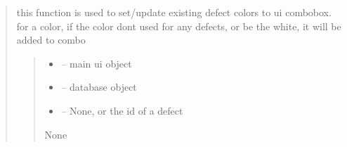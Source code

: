 \documentclass[letterpaper,10pt,english]{sphinxmanual}
\begin{document}
\begin{quote}
\begin{savenotes}\begin{fulllineitems}
\label{\detokenize{setting/backend/defect_management_funcs:oxin.backend.defect_management_funcs.assign_existing_defect_colors_to_ui}}
\pysigstartsignatures
{}
\pysigstopsignatures
\sphinxAtStartPar
this function is used to set/update existing defect colors to ui combobox.
for a color, if the color dont used for any defects, or be the white, it will be added to combo
\begin{quote}\begin{description}
\begin{itemize}
\item {} 
\sphinxAtStartPar
{} – main ui object

\item {} 
\sphinxAtStartPar
{} – database object

\item {} 
\sphinxAtStartPar
{} – None, or the id of a defect

\end{itemize}

\sphinxAtStartPar
None

\end{description}\end{quote}

\end{fulllineitems}\end{savenotes}



\end{quote}
\end{document}
